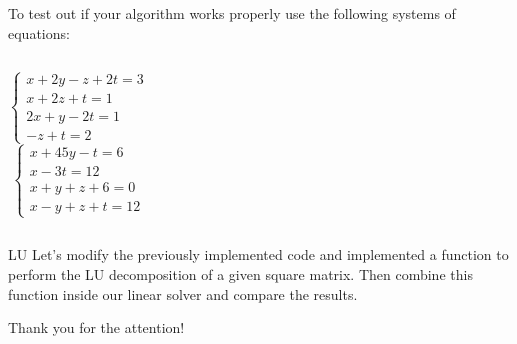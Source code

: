 \documentclass[xcolor={dvipsnames,rgb}, aspectratio=169]{beamer}
\begin{document}
\begin{frame}{}
To test out if your algorithm works properly use the following systems of equations:
\vspace{1.5cm}
\begin{columns}
   \begin{equation*}
       \begin{cases}
       x + 2y - z + 2t = 3 \\
       x + 2z + t = 1 \\
       2x + y - 2t = 1 \\
       -z + t = 2
       \end{cases}
   \end{equation*}
   \begin{equation*}
       \begin{cases}
       x + 45y - t = 6 \\
       x - 3t = 12 \\
       x + y + z + 6 = 0 \\
       x - y + z + t = 12
       \end{cases}
   \end{equation*}
\end{columns}
\end{frame}

\begin{frame}{LU}
   Let's modify the previously implemented code and implemented a function to perform the
   \alert{LU} decomposition of a given square matrix. Then combine this function inside
   our linear solver and compare the results.
\end{frame}
{%
\begin{frame}[standout]
	Thank you for the attention!
\end{frame}
}
\end{document}
